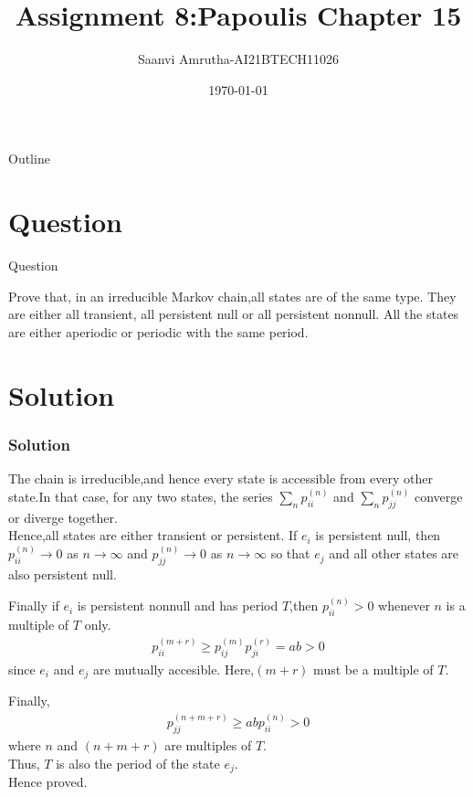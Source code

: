 \documentclass{beamer}
\title{Assignment 8:Papoulis Chapter 15}
\author{Saanvi Amrutha-AI21BTECH11026}
\date{\today}
\providecommand{\brak}[1]{\ensuremath{\left(#1\right)}}
\begin{document}
\begin{frame}
    \titlepage 
\end{frame}

\logo{}

\begin{frame}{Outline}
    \tableofcontents
\end{frame}

\section{Question}
\begin{frame}{Question}
    \begin{block}{}
       Prove that, in an irreducible Markov chain,all states are of the same type. They are either all transient, all persistent null or all persistent nonnull. All the states are either aperiodic or periodic with the same period.
    \end{block}
\end{frame}

\section{Solution}

\begin{frame}
\frametitle{Solution}
   The chain is irreducible,and hence every state is accessible from every other state.In that case, for any two states, the series $\sum_n p_{ii}^{\brak{n}}$ and $\sum_n p_{jj}^{\brak{n}}$ converge or diverge together.\\
   Hence,all states are either transient or persistent. If $e_i$ is persistent null, then $p_{ii}^{\brak{n}}\rightarrow 0$ as $n\rightarrow \infty$ and $p_{jj}^{\brak{n}}\rightarrow 0$ as $n\rightarrow \infty$ so that $e_j$ and all other states are also persistent null.
\end{frame}

\begin{frame}
    Finally if $e_i$ is persistent nonnull and has period $T$,then $p_{ii}^{\brak{n}}>0$ whenever $n$ is a multiple of $T$ only.\\
\begin{align}
    p_{ii}^{\brak{m+r}}\geq p_{ij}^{\brak{m}}p_{ji}^{\brak{r}}=ab>0
\end{align}
since $e_i$ and $e_j$ are mutually accesible.
Here,$\brak{m+r}$ must be a multiple of $T$.\\
\end{frame}

\begin{frame}
    Finally,
    \begin{align}
       p_{jj}^{\brak{n+m+r}}\geq ab p_{ii}^{\brak{n}}>0
    \end{align}
    where $n$ and $\brak{n+m+r}$ are multiples of $T$.\\ Thus, $T$ is also the period of the state $e_j$.\\
    Hence proved.
\end{frame}
\end{document}
